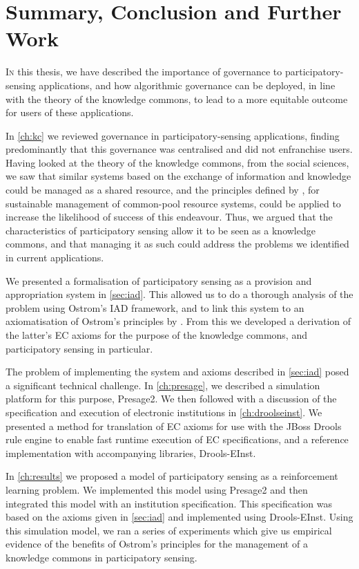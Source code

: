 \acresetall
\chapter{Summary, Conclusion and Further Work}\label{ch:conc}

\lettrine[lines=3]{I}{n} this thesis, we have described the importance of
governance to part\-icipatory-sensing applications, and how algorithmic
governance can be deployed, in line with the theory of the knowledge commons,
to lead to a more equitable outcome for users of these applications.

In \autoref{ch:kc} we reviewed governance in participatory-sensing
applications, finding predominantly that this governance was centralised and did not
enfranchise users. Having looked at the theory of the knowledge commons, from
the social sciences, we saw that similar systems based on the exchange of
information and knowledge could be managed as a shared resource, and the
principles defined by \citet{Ostrom1990}, for sustainable management of common-pool resource systems, could be applied to increase the
likelihood of success of this endeavour. Thus, we argued that the
characteristics of participatory sensing allow it to be seen as a knowledge
commons, and that managing it as such could address the problems we identified in
current applications.

We presented a formalisation of participatory sensing as a provision and
appropriation system in \autoref{sec:iad}. This allowed us to do a thorough
analysis of the problem using Ostrom's \ac{IAD} framework, and to link this
system to an axiomatisation of Ostrom's principles by \citet{Pitt2012b}. From this we
developed a derivation of the latter's \ac{EC} axioms for the purpose of the
knowledge commons, and participatory sensing in particular.

The problem of implementing the system and axioms described in
\autoref{sec:iad} posed a significant technical challenge. In
\autoref{ch:presage}, we described a simulation platform for this purpose, Presage2.
We then followed with a discussion of the specification and execution of
electronic institutions in \autoref{ch:droolseinst}. We presented a method for
translation of \ac{EC} axioms for use with the JBoss Drools rule engine to
enable fast runtime execution of \ac{EC} specifications, and a reference
implementation with accompanying libraries, Drools-EInst.

In \autoref{ch:results} we proposed a model of participatory sensing as a
reinforcement learning problem. We implemented this model using Presage2 and then
integrated this model with an institution specification. This specification was based on the axioms
given in \autoref{sec:iad} and implemented using Drools-EInst. Using this
simulation model, we ran a series of experiments which give us empirical
evidence of the benefits of Ostrom's principles for the management of a knowledge
commons in participatory sensing.

